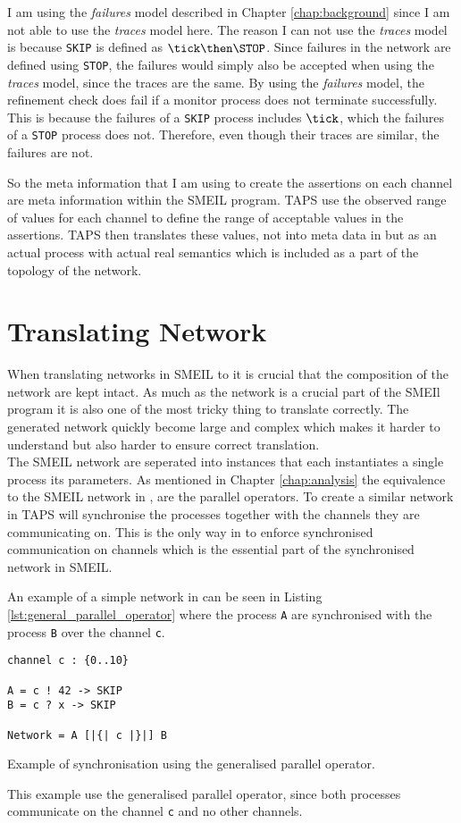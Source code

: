 I am using the \textit{failures} model described in Chapter \ref{chap:background} since I am not able to use the \textit{traces} model here. The reason I can not use the \textit{traces} model is because \texttt{SKIP} is defined as $\tick \then \STOP$. Since failures in the network are defined using \texttt{STOP}, the failures would simply also be accepted when using the \textit{traces} model, since the traces are the same. By using the \textit{failures} model, the refinement check does fail if a monitor process does not terminate successfully. This is because the failures of a \texttt{SKIP} process includes $\tick$, which the failures of a \texttt{STOP} process does not. Therefore, even though their traces are similar, the failures are not.


So the meta information that I am using to create the assertions on each channel are meta information within the SMEIL program. TAPS use the observed range of values for each channel to define the range of acceptable values in the assertions. TAPS then translates these values, not into meta data in \cspm{} but as an actual process with actual real semantics which is included as a part of the topology of the \cspm{} network.
\section{Translating Network}
\label{sec:design_translating_network}
When translating networks in SMEIL to \cspm{} it is crucial that the composition of the network are kept intact. As much as the network is a crucial part of the SMEIl program it is also one of the most tricky thing to translate correctly. The generated network quickly become large and complex which makes it harder to understand but also harder to ensure correct translation. \\

The SMEIL network are seperated into instances that each instantiates a single process its parameters. As mentioned in Chapter \ref{chap:analysis} the equivalence to the SMEIL network in \cspm{}, are the parallel operators. To create a similar network in \cspm{} TAPS will synchronise the processes together with the channels they are communicating on.
This is the only way in \cspm{} to enforce synchronised communication on channels which is the essential part of the synchronised network in SMEIL.

An example of a simple network in \cspm{} can be seen in Listing \ref{lst:general_parallel_operator} where the process \texttt{A} are synchronised with the process \texttt{B} over the channel \texttt{c}.
\begin{listing}
\begin{verbatim}
channel c : {0..10}

A = c ! 42 -> SKIP
B = c ? x -> SKIP

Network = A [|{| c |}|] B
\end{verbatim}
\caption{Example of synchronisation using the generalised parallel operator.}
\label{lst:general_parallel_operator}
\end{listing}
This example use the generalised parallel operator, since both processes communicate on the channel \texttt{c} and no other channels.


